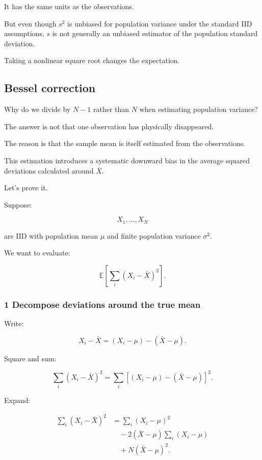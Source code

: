 It has the same units as the observations.

But even though \(s^2\) is unbiased for population variance under the standard IID assumptions, \(s\) is not generally an unbiased estimator of the population standard deviation.

Taking a nonlinear square root changes the expectation.

\subsection{Bessel correction}\label{02-foundations-ii-ch030-bessel-correction}

Why do we divide by \(N-1\) rather than \(N\) when estimating population variance?

The answer is not that one observation has physically disappeared.

The reason is that the sample mean is itself estimated from the observations.

This estimation introduces a systematic downward bias in the average squared deviations calculated around \(\bar X\).

Let's prove it.

Suppose:

\[
 X_1,\ldots,X_N
\]

are IID with population mean \(\mu\) and finite population variance \(\sigma^2\).

We want to evaluate:

\[
 \mathbb E\left[ \sum_i(X_i-\bar X)^2 \right].
\]

\subsubsection{1 Decompose deviations around the true mean}\label{02-foundations-ii-ch030-decompose-deviations-around-the-true-mean}

Write:

\[
 X_i-\bar X = (X_i-\mu)-(\bar X-\mu).
\]

Square and sum:

\[
 \sum_i(X_i-\bar X)^2 = \sum_i[ (X_i-\mu)-(\bar X-\mu) ]^2.
\]

Expand:

\[
 \begin{aligned} \sum_i(X_i-\bar X)^2 &= \sum_i(X_i-\mu)^2\\ &\quad-2(\bar X-\mu)\sum_i(X_i-\mu)\\ &\quad+N(\bar X-\mu)^2. \end{aligned}
\]

